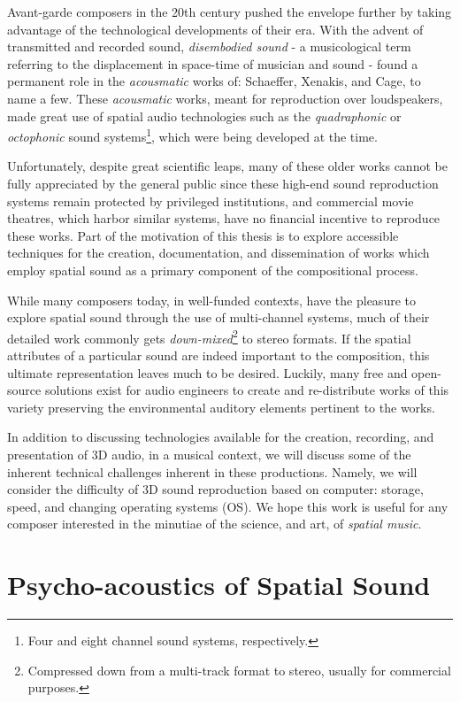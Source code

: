 Avant-garde composers in the 20th century pushed the envelope further by taking advantage of the technological developments of their era. With the advent of transmitted and recorded sound, \textit{disembodied sound} - a musicological term referring to the displacement in space-time of musician and sound - found a permanent role in the \textit{acousmatic} works of: Schaeffer, Xenakis, and Cage, to name a few. These \textit{acousmatic} works, meant for reproduction over loudspeakers, made great use of spatial audio technologies such as the \textit{quadraphonic} or \textit{octophonic} sound systems\footnote{Four and eight channel sound systems, respectively.}, which were being developed at the time.

Unfortunately, despite great scientific leaps, many of these older works cannot be fully appreciated by the general public since these high-end sound reproduction systems remain protected by privileged institutions, and commercial movie theatres, which harbor similar systems, have no financial incentive to reproduce these works. Part of the motivation of this thesis is to explore accessible techniques for the creation, documentation, and dissemination of works which employ spatial sound as a primary component of the compositional process. 

While many composers today, in well-funded contexts, have the pleasure to explore spatial sound through the use of multi-channel systems, much of their detailed work commonly gets \textit{down-mixed}\footnote{Compressed down from a multi-track format to stereo, usually for commercial purposes.} to stereo formats. If the spatial attributes of a particular sound are indeed important to the composition, this ultimate representation leaves much to be desired. Luckily, many free and open-source solutions exist for audio engineers to create and re-distribute works of this variety preserving the environmental auditory elements pertinent to the works.

In addition to discussing technologies available for the creation, recording, and presentation of 3D audio, in a musical context, we will discuss some of the inherent technical challenges inherent in these productions. Namely, we will consider the difficulty of 3D sound reproduction based on computer: storage, speed, and changing operating systems (OS). We hope this work is useful for any composer interested in the minutiae of the science, and art, of \textit{spatial music}.

\section{Psycho-acoustics of Spatial Sound}

